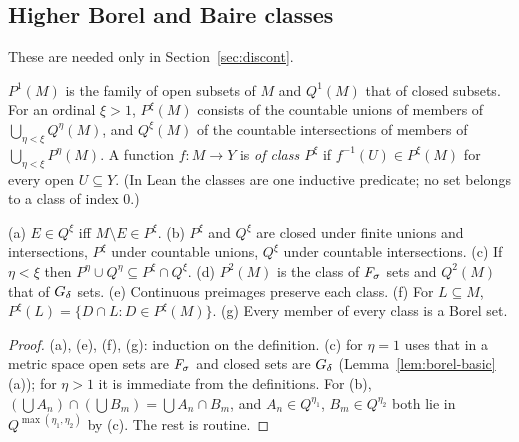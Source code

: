 \subsection{Higher Borel and Baire classes}
These are needed only in Section~\ref{sec:discont}.

\begin{definition}\label{def:additive-classes}
$P^1(M)$ is the family of open subsets of $M$ and $Q^1(M)$ that of closed subsets. For an ordinal
$\xi>1$, $P^\xi(M)$ consists of the countable unions of members of $\bigcup_{\eta<\xi}Q^\eta(M)$, and
$Q^\xi(M)$ of the countable intersections of members of $\bigcup_{\eta<\xi}P^\eta(M)$. A function
$f:M\to Y$ is \emph{of class $P^\xi$} if $f^{-1}(U)\in P^\xi(M)$ for every open $U\subseteq Y$.
(In Lean the classes are one inductive predicate; no set belongs to a class of index $0$.)
\end{definition}

\begin{lemma}\label{lem:additive-basic}
(a) $E\in Q^\xi$ iff $M\setminus E\in P^\xi$. (b) $P^\xi$ and $Q^\xi$ are closed under finite unions and
intersections, $P^\xi$ under countable unions, $Q^\xi$ under countable intersections. (c) If $\eta<\xi$
then $P^\eta\cup Q^\eta\subseteq P^\xi\cap Q^\xi$. (d) $P^2(M)$ is the class of $F_\sigma$ sets and
$Q^2(M)$ that of $G_\delta$ sets. (e) Continuous preimages preserve each class. (f) For $L\subseteq M$,
$P^\xi(L)=\{D\cap L:D\in P^\xi(M)\}$. (g) Every member of every class is a Borel set.
\end{lemma}
\begin{proof}
(a), (e), (f), (g): induction on the definition. (c) for $\eta=1$ uses that in a metric space open sets are $F_\sigma$ and closed
sets are $G_\delta$ (Lemma~\ref{lem:borel-basic}(a)); for $\eta>1$ it is immediate from the definitions. For (b), $(\bigcup A_n)\cap(\bigcup B_m)=\bigcup A_n\cap B_m$, and
$A_n\in Q^{\eta_1}$, $B_m\in Q^{\eta_2}$ both lie in $Q^{\max(\eta_1,\eta_2)}$ by (c). The rest is
routine.
\end{proof}

